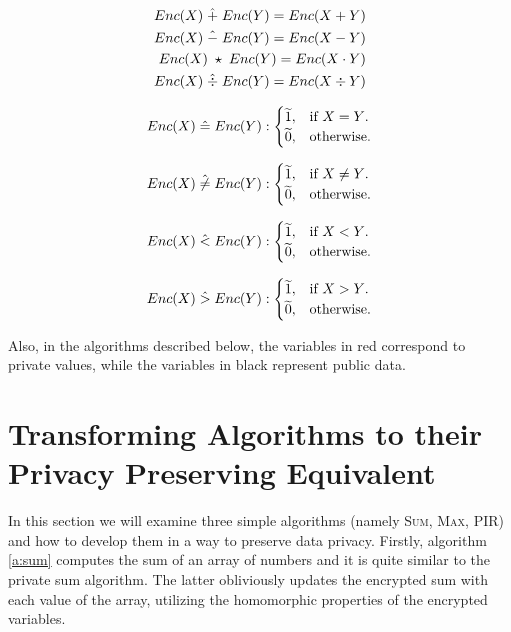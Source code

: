 \begin{equation}\label{eq:operands}
  \begin{aligned}
      Enc(X) \;\hat{+}\; Enc(Y) = Enc(X + Y)\\
      Enc(X) \;\hat{-}\; Enc(Y) = Enc(X - Y)\\
      Enc(X) \;\star\; Enc(Y) = Enc(X \cdot Y)\\
      Enc(X) \;\hat{\div}\; Enc(Y) = Enc(X \div Y)
  \end{aligned}
\end{equation}

\begin{equation}\label{eq:equal}
  Enc(X) \;\hat{=}\; Enc(Y) :\begin{cases}
    \widetilde{1}, & \text{if $X = Y$}.\\
    \widetilde{0}, & \text{otherwise}.
  \end{cases}
\end{equation}

\begin{equation}\label{eq:not-equal}
  Enc(X) \;\hat{\neq}\; Enc(Y) :\begin{cases}
    \widetilde{1}, & \text{if $X \neq Y$}.\\
    \widetilde{0}, & \text{otherwise}.
  \end{cases}
\end{equation}

\begin{equation}\label{eq:lt}
  Enc(X) \;\hat{<}\; Enc(Y) :\begin{cases}
    \widetilde{1}, & \text{if $X < Y$}.\\
    \widetilde{0}, & \text{otherwise}.
  \end{cases}
\end{equation}

\begin{equation}\label{eq:gt}
  Enc(X) \;\hat{>}\; Enc(Y) :\begin{cases}
    \widetilde{1}, & \text{if $X > Y$}.\\
    \widetilde{0}, & \text{otherwise}.
  \end{cases}
\end{equation}

Also, in the algorithms described below, the variables in {\color{darkred} red} correspond to private values, while the variables in black represent public data.


\section{Transforming Algorithms to their Privacy Preserving Equivalent}\label{s:simple-algorithms}
In this section we will examine three simple algorithms (namely {\textsc{Sum}, \textsc{Max}, \textsc{PIR}}) and how to develop them in a way to preserve data privacy.
Firstly, algorithm \ref{a:sum} computes the sum of an array of numbers and it is quite similar to the private sum algorithm.
The latter obliviously updates the encrypted sum with each value of the array, utilizing the homomorphic properties of the encrypted variables.

